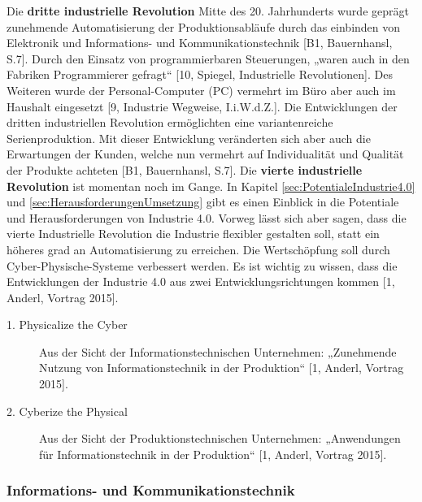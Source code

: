 \newline\newline
Die \textbf{dritte industrielle Revolution} Mitte des 20. Jahrhunderts wurde geprägt zunehmende Automatisierung der Produktionsabläufe durch das einbinden von Elektronik und Informations- und Kommunikationstechnik [B1, Bauernhansl, S.7]. Durch den Einsatz von programmierbaren Steuerungen, „waren auch in den Fabriken Programmierer gefragt“ [10, Spiegel, Industrielle Revolutionen]. Des Weiteren wurde der Personal-Computer (PC) vermehrt im Büro aber auch im Haushalt eingesetzt [9, Industrie Wegweise, I.i.W.d.Z.]. Die Entwicklungen der dritten industriellen Revolution ermöglichten eine variantenreiche Serienproduktion. Mit dieser Entwicklung veränderten sich aber auch die Erwartungen der Kunden, welche nun vermehrt auf Individualität und Qualität der Produkte achteten [B1, Bauernhansl, S.7].
\newline\newline
Die \textbf{vierte industrielle Revolution} ist momentan noch im Gange. In Kapitel \ref{sec:PotentialeIndustrie4.0} und \ref{sec:HerausforderungenUmsetzung} gibt es einen Einblick in die Potentiale und Herausforderungen von Industrie 4.0. Vorweg lässt sich aber sagen, dass die vierte Industrielle Revolution die Industrie flexibler gestalten soll, statt ein höheres grad an Automatisierung zu erreichen. Die Wertschöpfung soll durch Cyber-Physische-Systeme verbessert werden. Es ist wichtig zu wissen, dass die Entwicklungen der Industrie 4.0 aus zwei Entwicklungsrichtungen kommen [1, Anderl, Vortrag 2015].
\begin{description}
	\item[1. Physicalize the Cyber] Aus der Sicht der Informationstechnischen Unternehmen: „Zunehmende Nutzung von Informationstechnik in der Produktion“ [1, Anderl, Vortrag 2015].
	\item[2. Cyberize the Physical] Aus der Sicht der Produktionstechnischen Unternehmen: „Anwendungen für Informationstechnik in der Produktion“ [1, Anderl, Vortrag 2015].
\end{description}


\subsubsection{Informations- und Kommunikationstechnik}\label{sec:WebRevolution}

